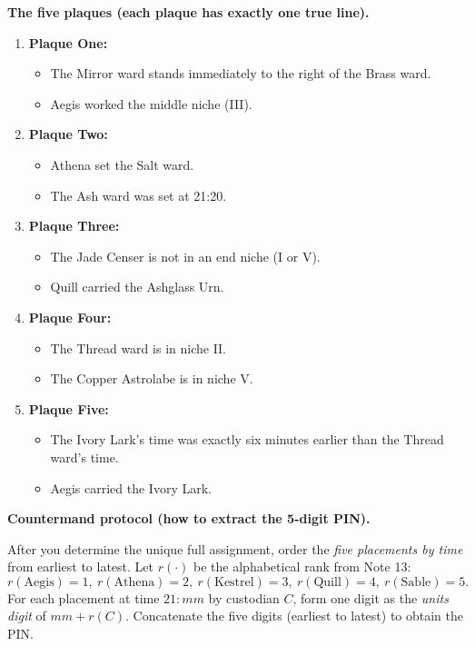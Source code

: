 \noindent\textbf{The five plaques (each plaque has exactly one true line).}
\begin{enumerate}[leftmargin=*]
\item \textbf{Plaque One:}
\begin{itemize}
\item The Mirror ward stands immediately to the right of the Brass ward.
\item Aegis worked the middle niche (III).
\end{itemize}

\item \textbf{Plaque Two:}
\begin{itemize}
\item Athena set the Salt ward.
\item The Ash ward was set at 21:20.
\end{itemize}

\item \textbf{Plaque Three:}
\begin{itemize}
\item The Jade Censer is not in an end niche (I or V).
\item Quill carried the Ashglass Urn.
\end{itemize}

\item \textbf{Plaque Four:}
\begin{itemize}
\item The Thread ward is in niche II.
\item The Copper Astrolabe is in niche V.
\end{itemize}

\item \textbf{Plaque Five:}
\begin{itemize}
\item The Ivory Lark’s time was exactly six minutes earlier than the Thread ward’s time.
\item Aegis carried the Ivory Lark.
\end{itemize}
\end{enumerate}

\medskip

\noindent\textbf{Countermand protocol (how to extract the 5-digit PIN).}

After you determine the unique full assignment, order the \emph{five placements by time} from earliest to latest.
Let $r(\cdot)$ be the alphabetical rank from Note 13:
\[
r(\text{Aegis})=1,\ r(\text{Athena})=2,\ r(\text{Kestrel})=3,\ r(\text{Quill})=4,\ r(\text{Sable})=5.
\]
For each placement at time $21{:}mm$ by custodian $C$, form one digit as the \emph{units digit} of $mm+r(C)$.
Concatenate the five digits (earliest to latest) to obtain the PIN.

